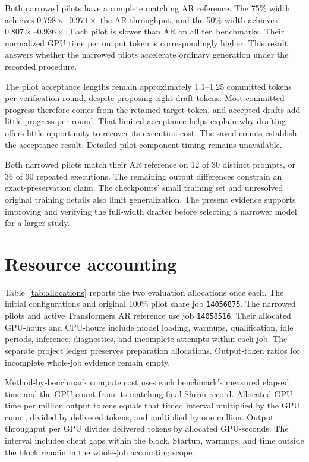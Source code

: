 \documentclass[conference,onecolumn]{IEEEtran}
\begin{document}
Both narrowed pilots have a complete matching AR reference. The 75\% width achieves $0.798\times$--$0.971\times$ the AR throughput, and the 50\% width achieves $0.807\times$--$0.936\times$. Each pilot is slower than AR on all ten benchmarks. Their normalized GPU time per output token is correspondingly higher. This result answers whether the narrowed pilots accelerate ordinary generation under the recorded procedure.

The pilot acceptance lengths remain approximately 1.1--1.25 committed tokens per verification round, despite proposing eight draft tokens. Most committed progress therefore comes from the retained target token, and accepted drafts add little progress per round. That limited acceptance helps explain why drafting offers little opportunity to recover its execution cost. The saved counts establish the acceptance result. Detailed pilot component timing remains unavailable.

Both narrowed pilots match their AR reference on 12 of 30 distinct prompts, or 36 of 90 repeated executions. The remaining output differences constrain an exact-preservation claim. The checkpoints' small training set and unresolved original training details also limit generalization. The present evidence supports improving and verifying the full-width drafter before selecting a narrower model for a larger study.

\section{Resource accounting}
Table~\ref{tab:allocations} reports the two evaluation allocations once each. The initial configurations and original 100\% pilot share job \texttt{14056875}. The narrowed pilots and active Transformers AR reference use job \texttt{14058516}. Their allocated GPU-hours and CPU-hours include model loading, warmups, qualification, idle periods, inference, diagnostics, and incomplete attempts within each job. The separate project ledger preserves preparation allocations. Output-token ratios for incomplete whole-job evidence remain empty.

Method-by-benchmark compute cost uses each benchmark's measured elapsed time and the GPU count from its matching final Slurm record. Allocated GPU time per million output tokens equals that timed interval multiplied by the GPU count, divided by delivered tokens, and multiplied by one million. Output throughput per GPU divides delivered tokens by allocated GPU-seconds. The interval includes client gaps within the block. Startup, warmups, and time outside the block remain in the whole-job accounting scope.
\end{document}
